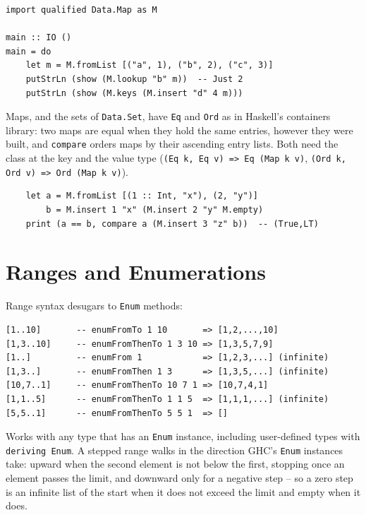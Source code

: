 \documentclass[11pt,a4paper]{article}
\begin{document}
\begin{lstlisting}
import qualified Data.Map as M

main :: IO ()
main = do
    let m = M.fromList [("a", 1), ("b", 2), ("c", 3)]
    putStrLn (show (M.lookup "b" m))  -- Just 2
    putStrLn (show (M.keys (M.insert "d" 4 m)))
\end{lstlisting}

Maps, and the sets of \texttt{Data.Set}, have \texttt{Eq} and
\texttt{Ord} as in Haskell's containers library: two maps are equal
when they hold the same entries, however they were built, and
\texttt{compare} orders maps by their ascending entry lists.  Both
need the class at the key and the value type
(\texttt{(Eq k, Eq v) => Eq (Map k v)},
\texttt{(Ord k, Ord v) => Ord (Map k v)}).

\begin{lstlisting}
    let a = M.fromList [(1 :: Int, "x"), (2, "y")]
        b = M.insert 1 "x" (M.insert 2 "y" M.empty)
    print (a == b, compare a (M.insert 3 "z" b))  -- (True,LT)
\end{lstlisting}

\section{Ranges and Enumerations}

Range syntax desugars to \texttt{Enum} methods:

\begin{lstlisting}
[1..10]       -- enumFromTo 1 10       => [1,2,...,10]
[1,3..10]     -- enumFromThenTo 1 3 10 => [1,3,5,7,9]
[1..]         -- enumFrom 1            => [1,2,3,...] (infinite)
[1,3..]       -- enumFromThen 1 3      => [1,3,5,...] (infinite)
[10,7..1]     -- enumFromThenTo 10 7 1 => [10,7,4,1]
[1,1..5]      -- enumFromThenTo 1 1 5  => [1,1,1,...] (infinite)
[5,5..1]      -- enumFromThenTo 5 5 1  => []
\end{lstlisting}

Works with any type that has an \texttt{Enum} instance, including
user-defined types with \texttt{deriving Enum}. A stepped range walks
in the direction GHC's \texttt{Enum} instances take: upward when the
second element is not below the first, stopping once an element passes
the limit, and downward only for a negative step -- so a zero step is
an infinite list of the start when it does not exceed the limit and
empty when it does.

\end{document}
